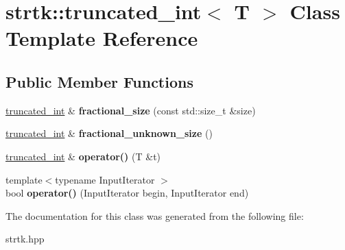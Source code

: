 \hypertarget{classstrtk_1_1truncated__int}{\section{strtk\-:\-:truncated\-\_\-int$<$ T $>$ Class Template Reference}
\label{classstrtk_1_1truncated__int}
}
\subsection*{Public Member Functions}
\begin{DoxyCompactItemize}
\item 
\hypertarget{classstrtk_1_1truncated__int_a29c5ad2012857809f79eca1ce73ae1f8}{\hyperlink{classstrtk_1_1truncated__int}{truncated\-\_\-int} \& {\bfseries fractional\-\_\-size} (const std\-::size\-\_\-t \&size)}\label{classstrtk_1_1truncated__int_a29c5ad2012857809f79eca1ce73ae1f8}

\item 
\hypertarget{classstrtk_1_1truncated__int_ae6f23122207432e0a073cae544b336a4}{\hyperlink{classstrtk_1_1truncated__int}{truncated\-\_\-int} \& {\bfseries fractional\-\_\-unknown\-\_\-size} ()}\label{classstrtk_1_1truncated__int_ae6f23122207432e0a073cae544b336a4}

\item 
\hypertarget{classstrtk_1_1truncated__int_ae7bfc1065762be417181e4aa9979da09}{\hyperlink{classstrtk_1_1truncated__int}{truncated\-\_\-int} \& {\bfseries operator()} (T \&t)}\label{classstrtk_1_1truncated__int_ae7bfc1065762be417181e4aa9979da09}

\item 
\hypertarget{classstrtk_1_1truncated__int_a55ab9836e3f7a73eb86626d2e8fe264a}{{\footnotesize template$<$typename Input\-Iterator $>$ }\\bool {\bfseries operator()} (Input\-Iterator begin, Input\-Iterator end)}\label{classstrtk_1_1truncated__int_a55ab9836e3f7a73eb86626d2e8fe264a}

\end{DoxyCompactItemize}


The documentation for this class was generated from the following file\-:\begin{DoxyCompactItemize}
\item 
strtk.\-hpp\end{DoxyCompactItemize}
